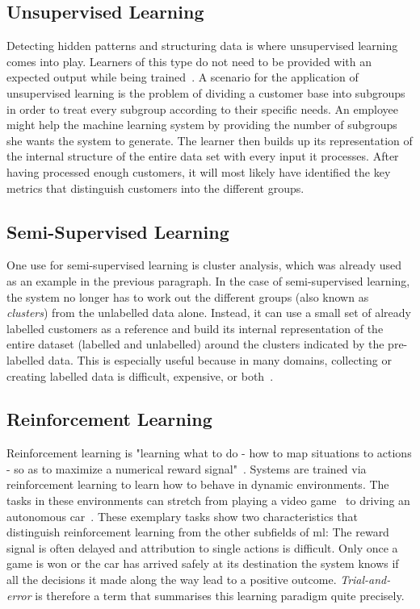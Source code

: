 \documentclass[
			   fontsize=11pt,
               paper=a4,
               bibliography=totoc,
               idxtotoc,
               headsepline,
               footsepline,
               footinclude=false,
               BCOR=12mm,
               DIV=13,
               openany,   %
               ]
               {scrbook}
\begin{document}
\subsection{Unsupervised Learning}
Detecting hidden patterns and structuring data is where unsupervised learning comes into play. Learners of this type do not need to be provided with an expected output while being trained~\cite{introUnsupervised}. A scenario for the application of unsupervised learning is the problem of dividing a customer base into subgroups in order to treat every subgroup according to their specific needs. An employee might help the machine learning system by providing the number of subgroups she wants the system to generate. The learner then builds up its representation of the internal structure of the entire data set with every input it processes. After having processed enough customers, it will most likely have identified the key metrics that distinguish customers into the different groups. 

\subsection{Semi-Supervised Learning}
One use for semi-supervised learning is cluster analysis, which was already used as an example in the previous paragraph. In the case of semi-supervised learning, the system no longer has to work out the different groups (also known as \textit{clusters}) from the unlabelled data alone. Instead, it can use a small set of already labelled customers as a reference and build its internal representation of the entire dataset (labelled and unlabelled) around the clusters indicated by the pre-labelled data. This is especially useful because in many domains, collecting or creating labelled data is difficult, expensive, or both~\cite{introSemiSup}.

\subsection{Reinforcement Learning}

Reinforcement learning is "learning what to do - how to map situations to actions - so as to maximize a numerical reward signal"~\cite{introRL}. Systems are trained via reinforcement learning to learn how to behave in dynamic environments. The tasks in these environments can stretch from playing a video game~\cite{rlStarCraft} to driving an autonomous car~\cite{rlCars}. These exemplary tasks show two characteristics that distinguish reinforcement learning from the other subfields of \gls{ml}: The reward signal is often delayed and attribution to single actions is difficult. Only once a game is won or the car has arrived safely at its destination the system knows if all the decisions it made along the way lead to a positive outcome. \textit{Trial-and-error} is therefore a term that summarises this learning paradigm quite precisely.
\end{document}
